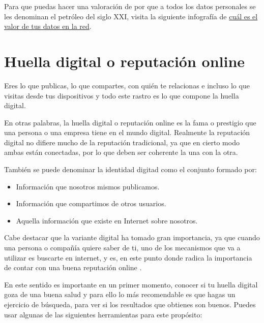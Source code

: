 \documentclass[
  a4paper,
  openany]{book}
\begin{document}
Para que puedas hacer una valoración de por que a todos los datos personales se les denominan el petróleo del siglo XXI, visita la siguiente infografía de \href{https://www.osi.es/sites/default/files/images/concienciacion/c15-pdf-infografia-ciberdelincuentes_reyes.pdf}{cuál es el valor de tus datos en la red}.

\hypertarget{huella-digital-o-reputaciuxf3n-online}{%
\section{Huella digital o reputación online}\label{huella-digital-o-reputaciuxf3n-online}}

Eres lo que publicas, lo que compartes, con quién te relacionas e incluso lo que visitas desde tus dispositivos y todo este rastro es lo que compone la huella digital.

En otras palabras, la huella digital o reputación online es la fama o prestigio que una persona o una empresa tiene en el mundo digital. Realmente la reputación digital no difiere mucho de la reputación tradicional, ya que en cierto modo ambas están conectadas, por lo que deben ser coherente la una con la otra.

También se puede denominar la identidad digitad como el conjunto formado por:

\begin{itemize}
\item
  Información que nosotros mismos publicamos.
\item
  Información que compartimos de otros usuarios.
\item
  Aquella información que existe en Internet sobre nosotros.
\end{itemize}

Cabe destacar que la variante digital ha tomado gran importancia, ya que cuando una persona o compañía quiere saber de ti, uno de los mecanismos que va a utilizar es buscarte en internet, y es, en este punto donde radica la importancia de contar con una buena reputación online \citep{huella-digital}.

En este sentido es importante en un primer momento, conocer si tu huella digital goza de una buena salud y para ello lo más recomendable es que hagas un ejercicio de búsqueda, para ver si los resultados que obtienes son buenos. Puedes usar algunas de las siguientes herramientas para este propósito:
\end{document}
